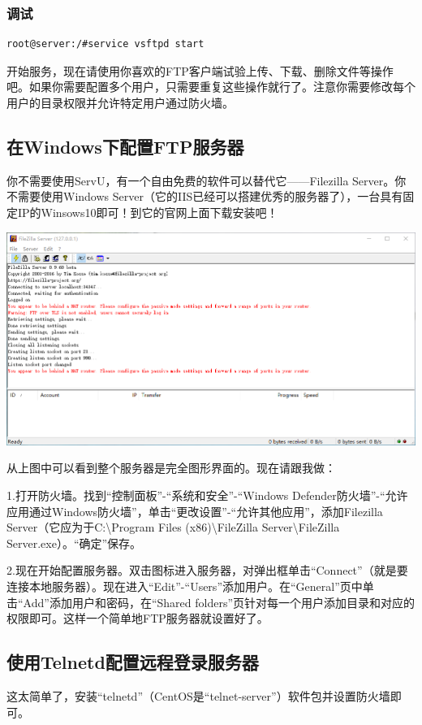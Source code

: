 \subsubsection{调试}
\begin{verbatim}
root@server:/#service vsftpd start
\end{verbatim}\par
开始服务，现在请使用你喜欢的FTP客户端试验上传、下载、删除文件等操作吧。如果你需要配置多个用户，只需要重复这些操作就行了。注意你需要修改每个用户的目录权限并允许特定用户通过防火墙。
\subsection{在Windows下配置FTP服务器}
你不需要使用ServU，有一个自由免费的软件可以替代它——Filezilla Server。你不需要使用Windows Server（它的IIS已经可以搭建优秀的服务器了），一台具有固定IP的Winsows10即可！到它的官网上面下载安装吧！
\begin{center}
	\includegraphics[scale=0.6]{pic/fzs}
\end{center} \par
从上图中可以看到整个服务器是完全图形界面的。现在请跟我做：\par
1.打开防火墙。找到“控制面板”-“系统和安全”-“Windows Defender防火墙”-“允许应用通过Windows防火墙”，单击“更改设置”-“允许其他应用”，添加Filezilla Server（它应为于C:\textbackslash Program Files (x86)\textbackslash FileZilla Server\textbackslash FileZilla Server.exe）。“确定”保存。\par
2.现在开始配置服务器。双击图标进入服务器，对弹出框单击“Connect”（就是要连接本地服务器）。现在进入“Edit”-“Users”添加用户。在“General”页中单击“Add”添加用户和密码，在“Shared folders”页针对每一个用户添加目录和对应的权限即可。这样一个简单地FTP服务器就设置好了。
\subsection{使用Telnetd配置远程登录服务器}
这太简单了，安装“telnetd”（CentOS是“telnet-server”）软件包并设置防火墙即可。
